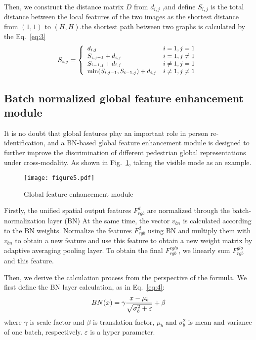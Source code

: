 \documentclass[journal]{IEEEtran}
\begin{document}
	Then, we construct the distance matrix $D$ from ${d_{i,j}}$ ,and define ${S_{i,j}}$  is the total distance between the local features of the two images as the shortest distance from $(1,1)$ to $(H,H)$.the shortest path between two graphs is calculated by the Eq.~\ref{eq:3}
	\begin{equation}
	\small
	\label{eq:3}
	{S_{i,j}} = \left\{ {\begin{array}{*{20}{l}}
			{{d_{i,j}}}&{i = 1,j = 1}\\
			{{S_{i,j - 1}} + {d_{i,j}}}&{i = 1,j \ne 1}\\
			{{S_{i - 1,j}} + {d_{i,j}}}&{i \ne 1,j = 1}\\
			{\min ({S_{i,j - 1}},{S_{i - 1,j}}) + {d_{i,j}}}&{i \ne 1,j \ne 1}
	\end{array}} \right.
	\end{equation}
	


\subsection{Batch normalized global feature enhancement module}
It is no doubt that global features play an important role in person re-identification, and a BN-based global feature enhancement module is designed to further improve the discrimination of different pedestrian global representations under cross-modality. As shown in  Fig.~\ref{fig5}, taking the visible mode as an example.

	\begin{figure}[!t]
		\centering
		\texttt{[image: figure5.pdf]}
		\vspace{-.05in}
		\caption{Global feature enhancement module}
		\label{fig5}
	\end{figure}
Firstly, the unified spatial output features $F_{rgb}^d$ are normalized through the batch-normalization layer (BN) At the same time, the vector ${v_{bn}}$ is calculated according to the BN weights. Normalize the features $F_{rgb}^d$ using BN and multiply them with ${v_{bn}}$ to obtain a new feature and use this feature to obtain a new weight matrix by adaptive averaging pooling layer. To obtain the final $F_{rgb}^{eglo}$, we linearly sum $F_{rgb}^{glo}$ and this feature.

Then, we derive the calculation process from the perspective of the formula. We first define the BN layer calculation, as in Eq.~\ref{eq:4}:
\begin{equation}
	\small
	\label{eq:4}
	BN(x) = \gamma \frac{{x - {\mu _b}}}{{\sqrt {\sigma _b^2 + \varepsilon } }} + \beta	
\end{equation}
where $\gamma$ is scale factor and $\beta$ is translation factor, ${\mu _b}$ and $\sigma _b^2$ is mean and variance of one batch, respectively. $\varepsilon$ is a hyper parameter.
\end{document}
